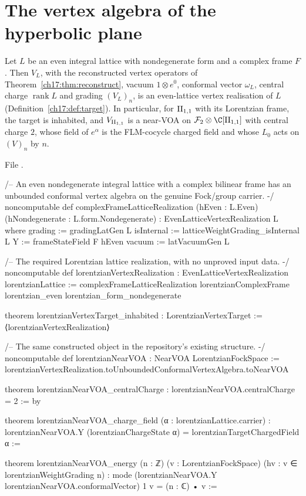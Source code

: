 \section{The vertex algebra of the hyperbolic plane}\label{ch17:sec:realization}

\begin{theorem}\label{ch17:thm:realization}
Let $L$ be an even integral lattice with nondegenerate form and a complex frame $F$.  Then $V_L$, with the
reconstructed vertex operators of Theorem~\ref{ch17:thm:reconstruct}, vacuum $1\otimes e^0$, conformal vector
$\omega_L$, central charge $\operatorname{rank}L$ and grading $(V_L)_n$, is an even-lattice vertex realisation of
$L$ (Definition~\ref{ch17:def:target}).  In particular, for ${\mathrm{II}_{1,1}}$ with its Lorentzian frame, the target
 is inhabited, and ${V_{\mathrm{II}_{1,1}}}$ is a near-VOA
 on $\chseventeenF_2\otimes\C[\chseventeenII]$ with central charge $2$, whose field of $e^\alpha$ is the
FLM-cocycle charged field and whose $L_0$ acts on $(V)_n$ by $n$.
\end{theorem}

\noindent File .
\begin{leancode}
/-- An even nondegenerate integral lattice with a complex bilinear frame has
an unbounded conformal vertex algebra on the genuine Fock/group carrier. -/
noncomputable def complexFrameLatticeRealization (hEven : L.Even)
    (hNondegenerate : L.form.Nondegenerate) : EvenLatticeVertexRealization L where
  grading := gradingLatGen L
  isInternal := latticeWeightGrading_isInternal L
  Y := frameStateField F hEven
  vacuum := latVacuumGen L

/-- The required Lorentzian lattice realization, with no unproved input data. -/
noncomputable def lorentzianVertexRealization : EvenLatticeVertexRealization lorentzianLattice :=
  complexFrameLatticeRealization lorentzianComplexFrame lorentzian_even lorentzian_form_nondegenerate

theorem lorentzianVertexTarget_inhabited : LorentzianVertexTarget :=
  ⟨lorentzianVertexRealization⟩

/-- The same constructed object in the repository's existing structure. -/
noncomputable def lorentzianNearVOA : NearVOA LorentzianFockSpace :=
  lorentzianVertexRealization.toUnboundedConformalVertexAlgebra.toNearVOA

theorem lorentzianNearVOA_centralCharge : lorentzianNearVOA.centralCharge = 2 := by

theorem lorentzianNearVOA_charge_field (α : lorentzianLattice.carrier) :
    lorentzianNearVOA.Y (lorentzianChargeState α) = lorentzianTargetChargedField α :=

theorem lorentzianNearVOA_energy (n : ℤ) (v : LorentzianFockSpace)
    (hv : v ∈ lorentzianWeightGrading n) :
    mode (lorentzianNearVOA.Y lorentzianNearVOA.conformalVector) 1 v = (n : ℂ) • v :=
\end{leancode}

